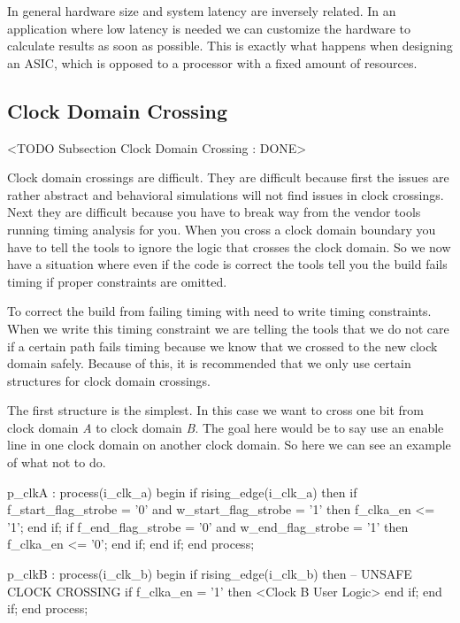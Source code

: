 In general hardware size and system latency are inversely related. In an application where low latency is needed we can customize the hardware to calculate results as soon as possible. This is exactly what happens when designing an \ac{ASIC}, which is opposed to a processor with a fixed amount of resources. 

\subsection{Clock Domain Crossing}
	<TODO Subsection Clock Domain Crossing : DONE>
	
Clock domain crossings are difficult. They are difficult because first the issues are rather abstract and behavioral simulations will not find issues in clock crossings. Next they are difficult because you have to break way from the vendor tools running timing analysis for you. When you cross a clock domain boundary you have to tell the tools to ignore the logic that crosses the clock domain. So we now have a situation where even if the code is correct the tools tell you the build fails timing if proper constraints are omitted. 

To correct the build from failing timing with need to write timing constraints. When we write this timing constraint we are telling the tools that we do not care if a certain path fails timing because we know that we crossed to the new clock domain safely. Because of this, it is recommended that we only use certain structures for clock domain crossings. 
	
The first structure is the simplest. In this case we want to cross one bit from clock domain \emph{A} to clock domain \emph{B}. The goal here would be to say use an enable line in one clock domain on another clock domain. So here we can see an example of what not to do. 

\begin{VHDLlisting}[tabsize=4]
p_clkA : process(i_clk_a)
begin
    if rising_edge(i_clk_a) then
        if f_start_flag_strobe = '0' and w_start_flag_strobe = '1' then
            f_clka_en <= '1';
        end if;
        if f_end_flag_strobe = '0' and w_end_flag_strobe = '1' then
            f_clka_en <= '0';
        end if;
    end if;
end process;

p_clkB : process(i_clk_b)
begin
    if rising_edge(i_clk_b) then
        -- UNSAFE CLOCK CROSSING
        if f_clka_en = '1' then
            <Clock B User Logic>
        end if;
    end if;
end process;
\end{VHDLlisting}	
	
